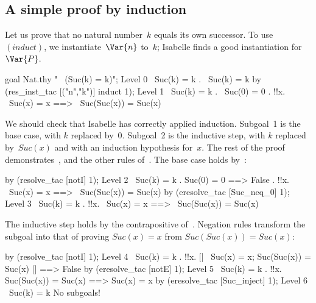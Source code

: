 \subsection{A simple proof by induction}
Let us prove that no natural number~$k$ equals its own successor.  To
use~$(induct)$, we instantiate~$\Var{n}$ to~$k$; Isabelle finds a good
instantiation for~$\Var{P}$.
\begin{ttbox}
goal Nat.thy "~ (Suc(k) = k)";
{\out Level 0}
{\out ~Suc(k) = k}
{. ~Suc(k) = k}
\ttbreak
by (res_inst_tac [("n","k")] induct 1);
{\out Level 1}
{\out ~Suc(k) = k}
{. ~Suc(0) = 0}
{. !!x. ~Suc(x) = x ==> ~Suc(Suc(x)) = Suc(x)}
\end{ttbox}
We should check that Isabelle has correctly applied induction.  Subgoal~1
is the base case, with $k$ replaced by~0.  Subgoal~2 is the inductive step,
with $k$ replaced by~$Suc(x)$ and with an induction hypothesis for~$x$.
The rest of the proof demonstrates~,  and the
other rules of~.  The base case holds by~:
\begin{ttbox}
by (resolve_tac [notI] 1);
{\out Level 2}
{\out ~Suc(k) = k}
{. Suc(0) = 0 ==> False}
{. !!x. ~Suc(x) = x ==> ~Suc(Suc(x)) = Suc(x)}
\ttbreak
by (eresolve_tac [Suc_neq_0] 1);
{\out Level 3}
{\out ~Suc(k) = k}
{. !!x. ~Suc(x) = x ==> ~Suc(Suc(x)) = Suc(x)}
\end{ttbox}
The inductive step holds by the contrapositive of~.
Negation rules transform the subgoal into that of proving $Suc(x)=x$ from
$Suc(Suc(x)) = Suc(x)$:
\begin{ttbox}
by (resolve_tac [notI] 1);
{\out Level 4}
{\out ~Suc(k) = k}
{. !!x. [| ~Suc(x) = x; Suc(Suc(x)) = Suc(x) |] ==> False}
\ttbreak
by (eresolve_tac [notE] 1);
{\out Level 5}
{\out ~Suc(k) = k}
{. !!x. Suc(Suc(x)) = Suc(x) ==> Suc(x) = x}
\ttbreak
by (eresolve_tac [Suc_inject] 1);
{\out Level 6}
{\out ~Suc(k) = k}
{\out No subgoals!}
\end{ttbox}


